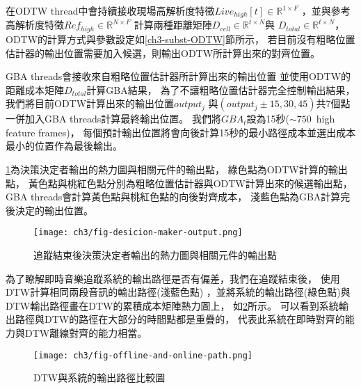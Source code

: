 \documentclass[class=NCU_thesis, crop=false]{standalone}
\begin{document}
在ODTW thread中會持續接收現場高解析度特徵$Live_{high}[t] \in \mathbb{R}^{1 \times F}$
，並與參考高解析度特徵$Ref_{high} \in \mathbb{R}^{N \times F}$
計算兩種距離矩陣$D_{cell} \in \mathbb{R}^{t \times N}$與
$D_{total} \in \mathbb{R}^{t \times N}$，
ODTW的計算方式與參數設定如\ref{ch3-subst-ODTW}節所示，
若目前沒有粗略位置估計器的輸出位置需要加入候選，則輸出ODTW所計算出來的對齊位置。

GBA threads會接收來自粗略位置估計器所計算出來的輸出位置
並使用ODTW的距離成本矩陣$D_{total}$計算GBA結果，
為了不讓粗略位置估計器完全控制輸出結果，
我們將目前ODTW計算出來的輸出位置$output_j$
與$(output_j\pm 15, 30, 45)$共7個點一併加入GBA threads計算最終輸出位置。
我們將$GBA_{t}$設為15秒($\sim 750$\ high feature frames)，
每個預計輸出位置將會向後計算15秒的最小路徑成本並選出成本最小的位置作為最後輸出。

\cref{fig:fig-ch3-desicion-maker-output}為決策決定者輸出的熱力圖與相關元件的輸出點，
綠色點為ODTW計算的輸出點，
黃色點與桃紅色點分別為粗略位置估計器與ODTW計算出來的候選輸出點，
GBA threads會計算黃色點與桃紅色點的向後對齊成本，
淺藍色點為GBA計算完後決定的輸出位置。

\begin{figure}[H]
    \centering
    \texttt{[image: ch3/fig-desicion-maker-output.png]}
    \caption{追蹤結束後決策決定者輸出的熱力圖與相關元件的輸出點}
    \label{fig:fig-ch3-desicion-maker-output}
\end{figure}

為了瞭解即時音樂追蹤系統的輸出路徑是否有偏差，我們在追蹤結束後，
使用DTW計算相同兩段音訊的輸出路徑(淺藍色點)
，並將系統的輸出路徑(綠色點)與DTW輸出路徑畫在DTW的累積成本矩陣熱力圖上，
如\cref{fig:fig-ch3-offline-and-online-path}所示。
可以看到系統輸出路徑與DTW的路徑在大部分的時間點都是重疊的，
代表此系統在即時對齊的能力與DTW離線對齊的能力相當。
\begin{figure}[H]
    \centering
    \texttt{[image: ch3/fig-offline-and-online-path.png]}
    \caption{DTW與系統的輸出路徑比較圖}
    \label{fig:fig-ch3-offline-and-online-path}
\end{figure}


\pagebreak
\end{document}
